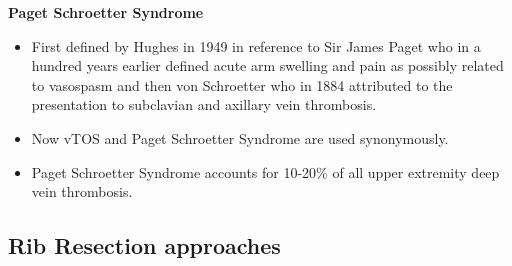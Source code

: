 \documentclass[
]{book}
\begin{document}
\textbf{Paget Schroetter Syndrome}

\begin{itemize}
\item
  First defined by Hughes in 1949 in reference to Sir James Paget who
  in a hundred years earlier defined acute arm swelling and pain as
  possibly related to vasospasm and then von Schroetter who in 1884
  attributed to the presentation to subclavian and axillary vein
  thrombosis. \citep{humphries123ThoracicOutlet2019}
\item
  Now vTOS and Paget Schroetter Syndrome are used synonymously.
\item
  Paget Schroetter Syndrome accounts for 10-20\% of all upper extremity
  deep vein thrombosis. \citep{sekharYearbookVascularEndovascular2018}
\end{itemize}

\hypertarget{rib-resection-approaches}{%
\subsection{Rib Resection approaches}\label{rib-resection-approaches}}
\end{document}
